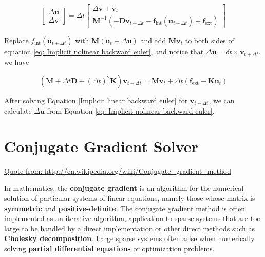 \begin{equation} \label{eq: Implicit nolinear backward euler}
	\left[ \begin{array}{c}
		\Delta \mathbf{u} \\
		\Delta \mathbf{v}
	\end{array} \right] = \Delta t \left[ \begin{array}{l}
	\Delta \mathbf{v}+\mathbf{v}_t \\
	\mathbf{M}^{-1}\left( -\mathbf{D}\mathbf{v}_{t+\Delta t}-\mathbf{f}_{\mathrm{int}}(\mathbf{u}_{t+\Delta t})+\mathbf{f}_{\mathrm{ext}}\right) 
\end{array} \right]
\end{equation}

Replace $ f_\mathrm{int}(\mathbf{u}_{t+\Delta t}) $ with $ \mathbf{M}(\mathbf{u}_t+\Delta \mathbf{u}) $ and add $ \mathbf{M}\mathbf{v}_t $ to both sides of equation \ref{eq: Implicit nolinear backward euler}, and notice that $ \Delta \mathbf{u} = \delta t \times \mathbf{v}_{t+\Delta t} $, we have

\begin{equation} \label{Implicit linear backward euler}
	\left(\mathbf{M}+\Delta t\mathbf{D}+(\Delta t)^2\mathbf{K}\right)\mathbf{v}_{t+\Delta t} = \mathbf{M}\mathbf{v}_t + \Delta t\left(\mathbf{f}_{\mathrm{ext}}-\mathbf{K}\mathbf{u}_t\right)
\end{equation}

After solving Equation \ref{Implicit linear backward euler} for $ \mathbf{v}_{t+\Delta t} $, we can calculate $ \Delta \mathbf{u} $ from Equation \ref{eq: Implicit nolinear backward euler}.

\section{Conjugate Gradient Solver} \label{App: conjugate gradient solver}
\url{Quote from: http://en.wikipedia.org/wiki/Conjugate_gradient_method}

In mathematics, the \textbf{conjugate gradient } is an algorithm for the numerical solution of particular systems of linear equations, namely those whose matrix is \textbf{symmetric} and \textbf{positive-definite}. The conjugate gradient method is often implemented as an iterative algorithm, application to sparse systems that are too large to be handled by a direct implementation or other direct methods such as \textbf{Cholesky decomposition}. Large sparse systems often arise when numerically solving \textbf{partial differential equations} or optimization problems.

